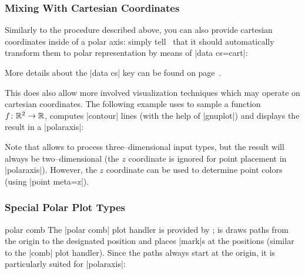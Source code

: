 {\subsubsection{Mixing With Cartesian Coordinates}
\label{sec:polar:cart}
Similarly to the procedure described above, you can also provide cartesian coordinates inside of a polar axis: simply tell \PGFPlots\ that it should automatically transform them to polar representation by means of |data cs=cart|:
\begin{codeexample}[]
\end{codeexample}
\noindent More details about the |data cs| key can be found on page~\pageref{key:data:cs}.

This does also allow more involved visualization techniques which may operate on cartesian coordinates. The following example uses  to sample a function $f\colon \mathbb{R}^2 \to \mathbb{R}$, computes |contour| lines (with the help of |gnuplot|) and displays the result in a |polaraxis|:
\pgfplotsexpensiveexample
\begin{codeexample}[]
\end{codeexample}
Note that  allows to process three--dimensional input types, but the result will always be two--dimensional (the $z$ coordinate is ignored for point placement in |polaraxis|). However, the $z$ coordinate can be used to determine point colors (using |point meta=z|).

\subsubsection{Special Polar Plot Types}
\begin{plottype}{polar comb}
	The |polar comb| plot handler is provided by \Tikz; is draws paths from the origin to the designated position and places |mark|s at the positions (similar to the |comb| plot handler). Since the paths always start at the origin, it is particularly suited for |polaraxis|:
\begin{codeexample}[]
\end{codeexample}
\end{plottype}

}
